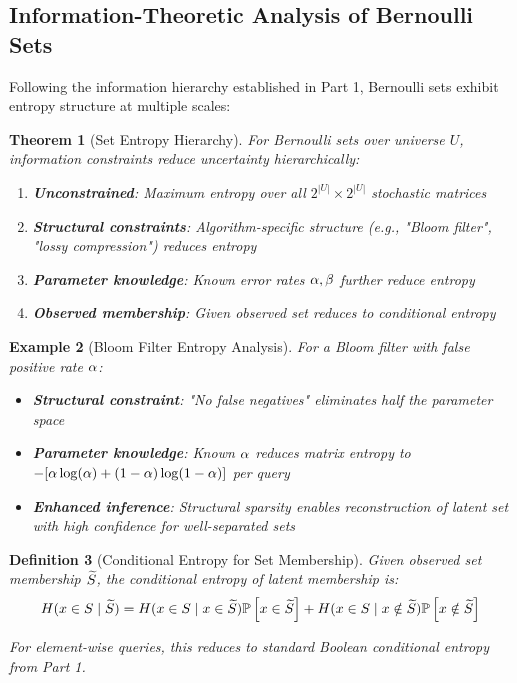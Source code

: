 \documentclass[11pt,final,hidelinks]{article}
\newtheorem{theorem}{Theorem}[section]
\newtheorem{definition}[theorem]{Definition}
\newtheorem{example}[theorem]{Example}
\begin{document}
\subsection{Information-Theoretic Analysis of Bernoulli Sets}

Following the information hierarchy established in Part 1, Bernoulli sets exhibit entropy structure at multiple scales:

\begin{theorem}[Set Entropy Hierarchy]
For Bernoulli sets over universe $U$, information constraints reduce uncertainty hierarchically:
\begin{enumerate}
    \item \textbf{Unconstrained}: Maximum entropy over all $2^{|U|} \times 2^{|U|}$ stochastic matrices
    \item \textbf{Structural constraints}: Algorithm-specific structure (e.g., "Bloom filter", "lossy compression") reduces entropy
    \item \textbf{Parameter knowledge}: Known error rates $\alpha, \beta$ further reduce entropy
    \item \textbf{Observed membership}: Given observed set reduces to conditional entropy
\end{enumerate}
\end{theorem}

\begin{example}[Bloom Filter Entropy Analysis]
For a Bloom filter with false positive rate $\alpha$:
\begin{itemize}
    \item \textbf{Structural constraint}: "No false negatives" eliminates half the parameter space
    \item \textbf{Parameter knowledge}: Known $\alpha$ reduces matrix entropy to $-[\alpha \log(\alpha) + (1-\alpha)\log(1-\alpha)]$ per query
    \item \textbf{Enhanced inference}: Structural sparsity enables reconstruction of latent set with high confidence for well-separated sets
\end{itemize}
\end{example}

\begin{definition}[Conditional Entropy for Set Membership]
Given observed set membership $\widetilde{S}$, the conditional entropy of latent membership is:
$$H(x \in S \mid \widetilde{S}) = H(x \in S \mid x \in \widetilde{S}) \mathbb{P}\left[x \in \widetilde{S}\right] + H(x \in S \mid x \notin \widetilde{S}) \mathbb{P}\left[x \notin \widetilde{S}\right]$$

For element-wise queries, this reduces to standard Boolean conditional entropy from Part 1.
\end{definition}
\end{document}
